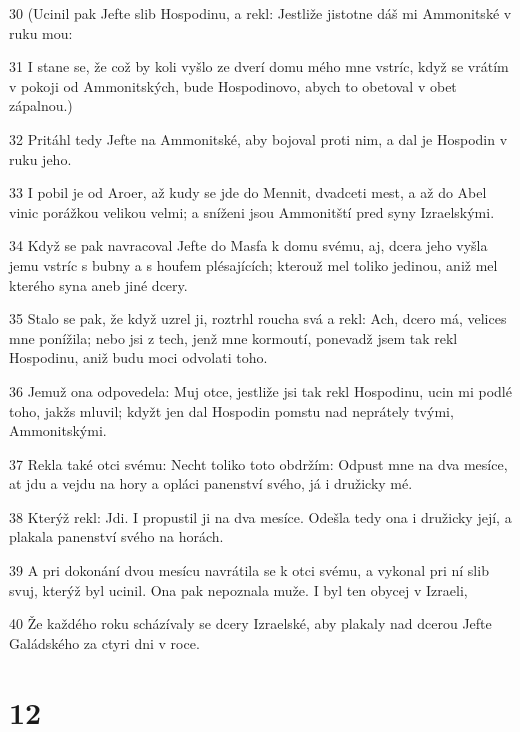 \par 30 (Ucinil pak Jefte slib Hospodinu, a rekl: Jestliže jistotne dáš mi Ammonitské v ruku mou:
\par 31 I stane se, že což by koli vyšlo ze dverí domu mého mne vstríc, když se vrátím v pokoji od Ammonitských, bude Hospodinovo, abych to obetoval v obet zápalnou.)
\par 32 Pritáhl tedy Jefte na Ammonitské, aby bojoval proti nim, a dal je Hospodin v ruku jeho.
\par 33 I pobil je od Aroer, až kudy se jde do Mennit, dvadceti mest, a až do Abel vinic porážkou velikou velmi; a sníženi jsou Ammonitští pred syny Izraelskými.
\par 34 Když se pak navracoval Jefte do Masfa k domu svému, aj, dcera jeho vyšla jemu vstríc s bubny a s houfem plésajících; kterouž mel toliko jedinou, aniž mel kterého syna aneb jiné dcery.
\par 35 Stalo se pak, že když uzrel ji, roztrhl roucha svá a rekl: Ach, dcero má, velices mne ponížila; nebo jsi z tech, jenž mne kormoutí, ponevadž jsem tak rekl Hospodinu, aniž budu moci odvolati toho.
\par 36 Jemuž ona odpovedela: Muj otce, jestliže jsi tak rekl Hospodinu, ucin mi podlé toho, jakžs mluvil; kdyžt jen dal Hospodin pomstu nad neprátely tvými, Ammonitskými.
\par 37 Rekla také otci svému: Necht toliko toto obdržím: Odpust mne na dva mesíce, at jdu a vejdu na hory a opláci panenství svého, já i družicky mé.
\par 38 Kterýž rekl: Jdi. I propustil ji na dva mesíce. Odešla tedy ona i družicky její, a plakala panenství svého na horách.
\par 39 A pri dokonání dvou mesícu navrátila se k otci svému, a vykonal pri ní slib svuj, kterýž byl ucinil. Ona pak nepoznala muže. I byl ten obycej v Izraeli,
\par 40 Že každého roku scházívaly se dcery Izraelské, aby plakaly nad dcerou Jefte Galádského za ctyri dni v roce.

\chapter{12}

